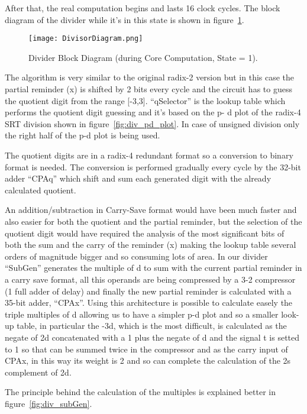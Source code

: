 After that, the real computation begins and lasts 16 clock cycles. The block diagram of the divider
while it's in this state is shown in figure~\ref{fig:div_block_dia}.

\begin{figure}[H]
\centering
\texttt{[image: DivisorDiagram.png]}
\caption{Divider Block Diagram (during Core Computation, State = 1).}
\label{fig:div_block_dia}
\end{figure}

The algorithm is very similar to the original radix-2 version but in this case the partial reminder (x)
is shifted by 2 bits every cycle and the circuit has to guess the quotient digit from the range [-3,3].
``qSelector'' is the lookup table which performs the quotient digit guessing and it's based on the p-
d plot of the radix-4 SRT division shown in figure~\ref{fig:div_pd_plot}. In case of unsigned division only the right half of
the p-d plot is being used.

The quotient digits are in a radix-4 redundant format so a conversion to binary format is needed.
The conversion is performed gradually every cycle by the 32-bit adder ``CPAq'' which shift and sum
each generated digit with the already calculated quotient.

An addition/subtraction in Carry-Save format would have been much faster and also easier for both the quotient and the partial reminder, but the selection of the quotient digit would have required the analysis of the most significant bits of
both the sum and the carry of the reminder (x) making the lookup table several orders of magnitude bigger and so consuming lots of area.
In our divider ``SubGen'' generates the multiple of d to sum with the current partial reminder in a
carry save format, all this operands are being compressed by a 3-2 compressor (1 full adder of
delay) and finally the new partial reminder is calculated with a 35-bit adder, ``CPAx''. Using this architecture is possible to calculate easely the triple multiples of d allowing us to have a simpler p-d plot and so a smaller look-up table, in particular the -3d, which is the most difficult, is calculated as the negate of 2d concatenated with a 1 plus the negate of d and the signal t is setted to 1 so that can be summed twice in the compressor and as the carry input of CPAx, in this way its weight is 2 and so can complete the calculation of the 2s complement of 2d.

The principle behind the calculation of the multiples is explained better in figure~\ref{fig:div_subGen}.

